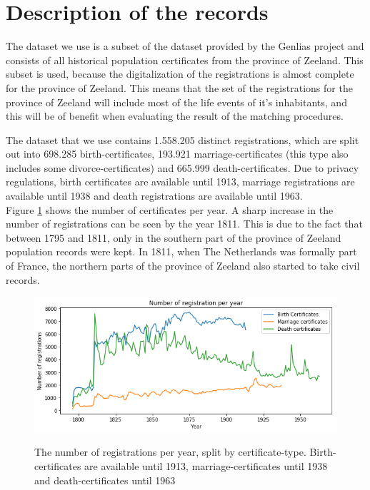 \section{Description of the records}
The dataset we use is a subset of the dataset provided by the Genlias project and consists of all historical population certificates from the province of Zeeland. This subset is used, because the digitalization of the registrations is almost complete for the province of Zeeland. This means that the set of the registrations for the province of Zeeland will include most of the life events of it's inhabitants, and this will be of benefit when evaluating the result of the matching procedures. 

The dataset that we use contains 1.558.205 distinct registrations, which are split out into 698.285 birth-certificates, 193.921 marriage-certificates (this type also includes some divorce-certificates) and 665.999 death-certificates. Due to privacy regulations, birth certificates are available until 1913, marriage registrations are available until 1938 and death registrations are available until 1963. 
\\

Figure \ref{fig:number_of_registrations} shows the number of certificates per year. A sharp increase in the number of registrations can be seen by the year 1811. This is due to the fact that between 1795 and 1811, only in the southern part of the province of Zeeland population records were kept. In 1811, when The Netherlands was formally part of France, the northern parts of the province of Zeeland also started to take civil records.
\begin{figure}
	\begin{center}
			\caption[The number of registrations per year, split by type]{The number of registrations per year, split by certificate-type. Birth-certificates are available until 1913, marriage-certificates until 1938 and death-certificates until 1963}
		\includegraphics[scale=0.6]{figures/opbouw_registrations.png}
		\label{fig:number_of_registrations}
	\end{center}
\end{figure}
\\

